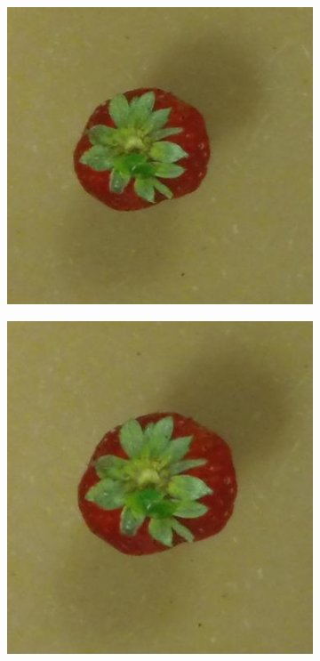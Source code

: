 \documentclass {udthesis}
\begin{document}
\begin{figure}
\begin{subfigure}[]{0.12\textwidth}
      \caption{}
  \end{subfigure}
  \begin{subfigure}[]{0.12\textwidth}
      \includegraphics[width=\textwidth]{strawberry4_obj_01/strawberry4_001_20}
      \caption{}
  \end{subfigure}
  \begin{subfigure}[]{0.12\textwidth}
      \includegraphics[width=\textwidth]{strawberry4_obj_01/strawberry4_001_18}

\end{subfigure}
\end{figure}
\end{document}
